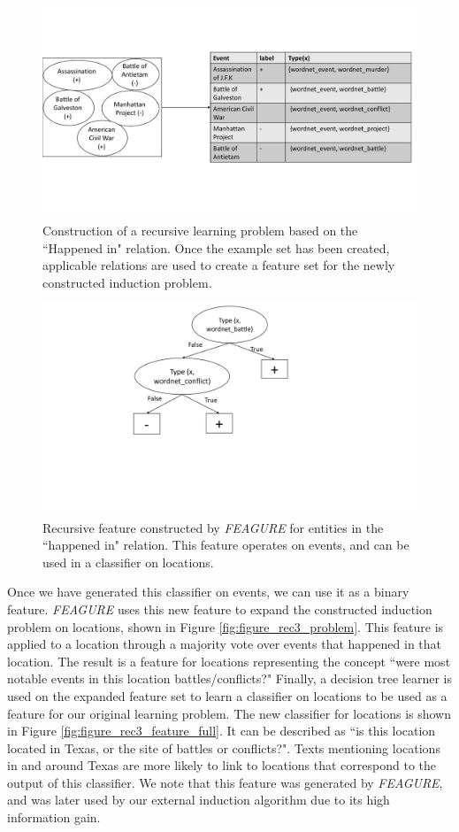 \documentclass[letterpaper]{article} %
\theoremstyle{definition}
\begin{document}
\begin{figure}[!h]
	\centering
	\includegraphics[width=0.9\linewidth]{figure_rec3_problem_rec_new}
	\caption{Construction of a recursive learning problem based on the ``Happened in" relation. Once the example set has been created, applicable relations are used to create a feature set for the newly constructed induction problem.}
	\label{fig:figure_rec3_problem_rec}
\end{figure}

\begin{figure}[!h]
	\centering
	\includegraphics[width=0.65\linewidth]{figure_rec3_feature_rec_new}
	\caption{Recursive feature constructed by \emph{FEAGURE} for entities in the ``happened in" relation. This feature operates on events, and can be used in a classifier on locations.}
	\label{fig:figure_rec3_feature}
\end{figure}

Once we have generated this classifier on events, we can use it as a binary feature. \emph{FEAGURE} uses this new feature to expand the constructed induction problem on locations, shown in Figure \ref{fig:figure_rec3_problem}.
This feature is applied to a location through a majority vote over events that happened in that location. The result is a feature for locations representing the concept ``were most notable events in this location battles/conflicts?"
Finally, a decision tree learner is used on the expanded feature set to learn a classifier on locations to be used as a feature for our original learning problem. The new classifier for locations is shown in Figure \ref{fig:figure_rec3_feature_full}. It can be described as ``is this location located in Texas, or the site of battles or conflicts?".
Texts mentioning locations in and around Texas are more likely to link to locations that correspond to the output of this classifier.
We note that this feature was generated by \emph{FEAGURE}, and was later used by our external induction algorithm due to its high information gain. 
\end{document}
